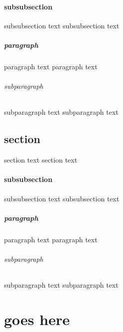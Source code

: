            \subsubsection[for the toc]{subsubsection}
           	subsubsection text
           	subsubsection text
           	\paragraph{paragraph}
           		paragraph text
           		paragraph text
           		\subparagraph{subparagraph}
           			subparagraph text
           			subparagraph text
          \section[for the toc]{section}
           section text
           section text
           \subsubsection[for the toc]{subsubsection}
           	subsubsection text
           	subsubsection text
           	\paragraph{paragraph}
           		paragraph text
           		paragraph text
           		\subparagraph{subparagraph}
           			subparagraph text
           			subparagraph text
         \chapter[somethingelse]{goes here}

